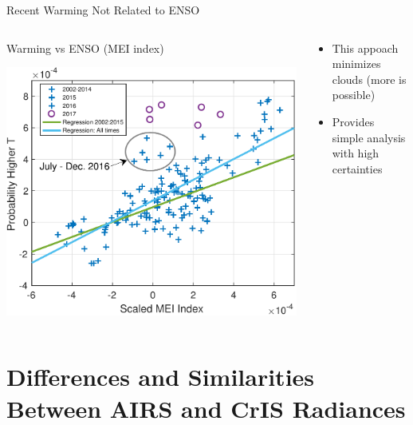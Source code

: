 \documentclass[10pt,t]{beamer}
\begin{document}
\begin{frame}{Recent Warming Not Related to ENSO}
  \begin{columns}
    \begin{column}{0.50\textwidth}
        \vspace{-0.2in}
      \begin{block}{\footnotesize Warming vs ENSO (MEI index)}
        \vspace{-0.1in}
        \begin{center}
          \includegraphics[width=0.80\linewidth]{./Figs_mei/Pdf/bt900_pdf_anom_highT_with_mei_index_v2_samemarker_but_2017.pdf}
        \end{center}
      \end{block}
    \end{column}

    \begin{column}{0.50\textwidth}
        \vspace{-0.1in}
        \begin{block}{}
        \small
        \begin{itemize}
        \item This appoach minimizes clouds (more is possible)
        \item Provides simple analysis with high certainties
        \end{itemize}
      \end{block}
    \end{column}
  \end{columns}

\end{frame}



\section{Differences and Similarities Between AIRS and CrIS Radiances}
\label{sec:org4822a7d}
\end{document}
